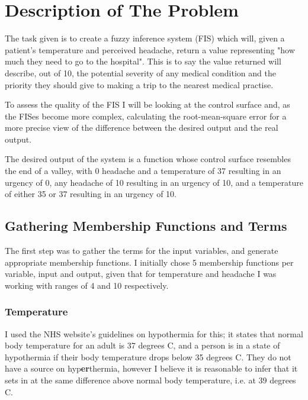 \documentclass[12pt, a4paper]{report}
\begin{document}
\maketitle

\tableofcontents

\section{Description of The Problem}

The task given is to create a fuzzy inference system (FIS) which will, given a patient's temperature and perceived headache, return a value representing "how much they need to go to the hospital".
This is to say the value returned will describe, out of 10, the potential severity of any medical condition and the priority they should give to making a trip to the nearest medical practise.

\par

To assess the quality of the FIS I will be looking at the control surface and, as the FISes become more complex, calculating the root-mean-square error for a more precise view of the difference between the desired output and the real output.

\par

The desired output of the system is a function whose control surface resembles the end of a valley, with 0 headache and a temperature of 37 resulting in an urgency of 0, any headache of 10 resulting in an urgency of 10, and a temperature of either 35 or 37 resulting in an urgency of 10.

\subsection{Gathering Membership Functions and Terms}

The first step was to gather the terms for the input variables, and generate appropriate membership functions.
I initially chose 5 membership functions per variable, input and output, given that for temperature and headache I was working with ranges of 4 and 10 respectively.

\subsubsection{Temperature}

I used the NHS website's guidelines on hypothermia for this; it states that normal body temperature for an adult is 37 degrees C, and a person is in a state of hypothermia if their body temperature drops below 35 degrees C.
They do not have a source on hyp\textbf{er}thermia, however I believe it is reasonable to infer that it sets in at the same difference above normal body temperature, i.e. at 39 degrees C.
\end{document}
